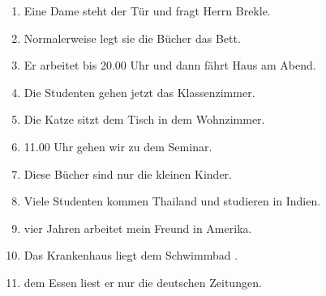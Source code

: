 \documentclass[12pt]{article}
\begin{document}
\begin{enumerate}
    \item Eine Dame steht \underline{\hspace{2cm}} der Tür und fragt Herrn Brekle.
    \item Normalerweise legt sie die Bücher \underline{\hspace{2cm}} das Bett.
    \item Er arbeitet bis 20.00 Uhr und dann fährt \underline{\hspace{2cm}} Haus am Abend.
    \item Die Studenten gehen jetzt \underline{\hspace{2cm}} das Klassenzimmer.
    \item Die Katze sitzt \underline{\hspace{2cm}} dem Tisch in dem Wohnzimmer.
    \item \underline{\hspace{2cm}} 11.00 Uhr gehen wir zu dem Seminar.
    \item Diese Bücher sind nur \underline{\hspace{2cm}} die kleinen Kinder.
    \item Viele Studenten kommen \underline{\hspace{2cm}} Thailand und studieren in Indien.
    \item \underline{\hspace{2cm}} vier Jahren arbeitet mein Freund in Amerika.
    \item Das Krankenhaus liegt dem Schwimmbad \underline{\hspace{2cm}}.
    \item \underline{\hspace{2cm}} dem Essen liest er nur die deutschen Zeitungen.
\end{enumerate}
\end{document}
